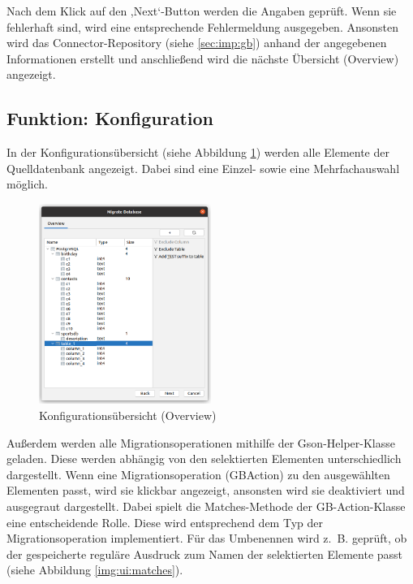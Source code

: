 		Nach dem Klick auf den ,Next‘-Button werden die Angaben geprüft. Wenn sie fehlerhaft sind, wird eine entsprechende Fehlermeldung ausgegeben. Ansonsten wird das Connector-Repository (siehe \ref{sec:imp:gb}) anhand der angegebenen Informationen erstellt und anschließend wird die nächste Übersicht (Overview) angezeigt.
	
\subsection{Funktion: Konfiguration}	
	In der Konfigurationsübersicht (siehe Abbildung \ref{img:ui:overviewSingleAdd}) werden alle Elemente der Quelldatenbank angezeigt. Dabei sind eine Einzel- sowie eine Mehrfachauswahl möglich. \\
	\begin{figure}[h]
		\centering
		\includegraphics[width=0.5\textwidth]{images/ui/overviewSingleAdd}
		\caption{Konfigurationsübersicht (Overview)}
		\label{img:ui:overviewSingleAdd}
	\end{figure}
	Außerdem werden alle Migrationsoperationen mithilfe der Gson-Helper-Klasse geladen. Diese werden abhängig von den selektierten Elementen unterschiedlich dargestellt. Wenn eine Migrationsoperation (GBAction) zu den ausgewählten Elementen passt, wird sie klickbar angezeigt, ansonsten wird sie deaktiviert und ausgegraut dargestellt. Dabei spielt die Matches-Methode der GB-Action-Klasse eine entscheidende Rolle. Diese wird entsprechend dem Typ der Migrationsoperation implementiert. Für das Umbenennen wird z. B. geprüft, ob der gespeicherte reguläre Ausdruck zum Namen der selektierten Elemente passt (siehe Abbildung \ref{img:ui:matches}).
	
